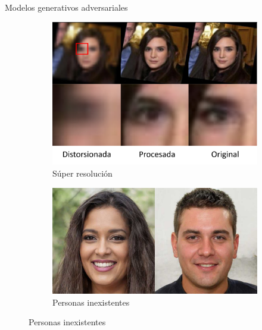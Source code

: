 \documentclass[12pt,aspectratio=169]{beamer}
\begin{document}
\begin{frame}{Modelos generativos adversariales}

    \begin{figure}
        \begin{subfigure}{0.48\textwidth}
            \centering
            \includegraphics[scale=0.23]{figs/superresolution_example.png}
            \caption{Súper resolución}
        \end{subfigure}
        \begin{subfigure}{0.48\textwidth}
            \centering
            \includegraphics[scale=0.23]{figs/personas_inexistentes.png}
            \caption{Personas inexistentes}
        \end{subfigure}
    \end{figure}

\end{frame}
\end{document}
